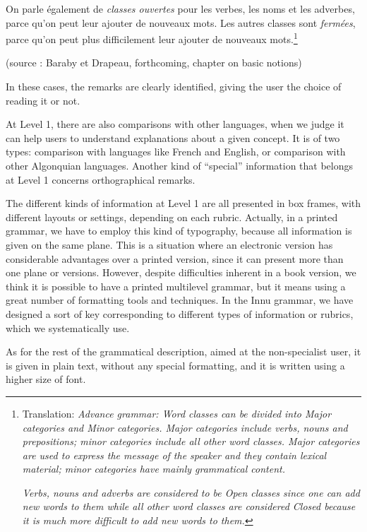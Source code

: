 \documentclass[letterpaper]{article}
\begin{document}
On parle \'egalement de \textit{classes ouvertes} pour les verbes, les noms et les adverbes, parce qu{\textquoteright}on peut leur ajouter de nouveaux mots. Les autres classes sont \textit{ferm\'ees}, parce qu{\textquoteright}on peut plus difficilement leur ajouter de nouveaux mots.\footnote{ Translation: \textit{Advance grammar: Word classes can be divided into Major categories and Minor categories. Major categories include verbs, nouns and prepositions; minor categories include all other word classes. Major categories are used to express the message of the speaker and they contain lexical material; minor categories have mainly grammatical content.}\par \textit{Verbs, nouns and adverbs are considered to be Open classes since one can add new words to them while all other word classes are considered Closed because it is much more difficult to add new words to them}\textit{.}}

(source : Baraby et Drapeau, forthcoming, chapter on basic notions)

In these cases, the remarks are clearly identified, giving the user the choice of reading it or not.

At Level 1, there are also comparisons with other languages, when we judge it can help users to understand explanations about a given concept. It is of two types: comparison with languages like French and English, or comparison with other Algonquian languages. Another kind of {\textquotedblleft}special{\textquotedblright} information that belongs at Level 1 concerns orthographical remarks.

The different kinds of information at Level 1 are all presented in box frames, with different layouts or settings, depending on each rubric. Actually, in a printed grammar, we have to employ this kind of typography, because all information is given on the same plane. This is a situation where an electronic version has considerable advantages over a printed version, since it can present more than one plane or versions. However, despite difficulties inherent in a book version, we think it is possible to have a printed multilevel grammar, but it means using a great number of formatting tools and techniques. In the Innu grammar, we have designed a sort of key corresponding to different types of information or rubrics, which we systematically use.

As for the rest of the grammatical description, aimed at the non-specialist user, it is given in plain text, without any special formatting, and it is written using a higher size of font.
\end{document}
